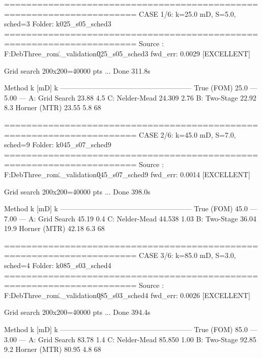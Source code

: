 
======================================================================
 CASE 1/6: k=25.0 mD, S=5.0, sched=3
 Folder: k025_s05_sched3
======================================================================
  Source : F:\Niloy Deb\Part Three\reservoir_rom\notebooks\..\data{}_validation\k025_s05_sched3
  fwd_err: 0.0029  [EXCELLENT]

  Grid search 200x200=40000 pts ...
  Done 311.8s

  Method                   k [mD]   k%
  --------------------------------------------------------
  True (FOM)                 25.0       —    5.00       —
  A: Grid Search            23.88    4.5%
  C: Nelder-Mead           24.309   2.76%
  B: Two-Stage              22.92     8.3%
  Horner (MTR)              23.55    5.8%
  68%

======================================================================
 CASE 2/6: k=45.0 mD, S=7.0, sched=9
 Folder: k045_s07_sched9
======================================================================
  Source : F:\Niloy Deb\Part Three\reservoir_rom\notebooks\..\data{}_validation\k045_s07_sched9
  fwd_err: 0.0014  [EXCELLENT]

  Grid search 200x200=40000 pts ...
  Done 398.0s

  Method                   k [mD]   k%
  --------------------------------------------------------
  True (FOM)                 45.0       —    7.00       —
  A: Grid Search            45.19    0.4%
  C: Nelder-Mead           44.538   1.03%
  B: Two-Stage              36.04    19.9%
  Horner (MTR)              42.18    6.3%
  68%

======================================================================
 CASE 3/6: k=85.0 mD, S=3.0, sched=4
 Folder: k085_s03_sched4
======================================================================
  Source : F:\Niloy Deb\Part Three\reservoir_rom\notebooks\..\data{}_validation\k085_s03_sched4
  fwd_err: 0.0026  [EXCELLENT]

  Grid search 200x200=40000 pts ...
  Done 394.4s

  Method                   k [mD]   k%
  --------------------------------------------------------
  True (FOM)                 85.0       —    3.00       —
  A: Grid Search            83.78    1.4%
  C: Nelder-Mead           85.850   1.00%
  B: Two-Stage              92.85     9.2%
  Horner (MTR)              80.95    4.8%
  68%

